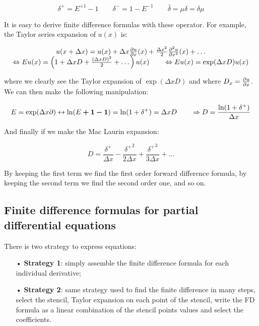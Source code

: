 \begin{equation}
\delta^+ = E^{+1}-1 \qquad \delta^- = 1-E^{-1} \qquad \bar{\delta} = \mu \delta = \delta \mu 
\end{equation}

It is easy to derive finite difference formulas with these operator. For example, the Taylor series expansion of $u(x)$ is: 

\begin{equation}
\begin{array}{c}
u(x+\Delta x) = u(x) + \Delta x\frac{\partial u}{\partial x} (x) + \frac{\Delta x^2}{2} \frac{\partial^2u}{\partial x^2}(x) + \dots \\
 \Leftrightarrow E u(x) = \left( 1 + \Delta x D + \frac{(\Delta x D)^2}{2} + \dots \right) u(x) \qquad \Leftrightarrow Eu(x) = \exp (\Delta x D) u(x)
 \end{array}
\end{equation}

where we clearly see the Taylor expansion of $\exp (\Delta x D)$ and where $D_x = \frac{\partial u }{\partial x}$. We can then make the following manipulation: 

\begin{equation}
E = \exp (\Delta x \partial) \leftrightarrow \ln (E \bm{+1 - 1}) = \ln(1 + \delta ^+) = \Delta x D \qquad \Rightarrow D = \frac{\ln (1 + \delta ^+)}{\Delta x}
\end{equation}

And finally if we make the Mac Laurin expansion: 

\begin{equation}
D = \frac{\delta ^+}{\Delta x} - \frac{{\delta ^+}^2}{2\Delta x} + \frac{{\delta ^+}^3}{3\Delta x} + \dots
\end{equation}

By keeping the first term we find the first order forward difference formula, by keeping the second term we find the second order one, and so on. 

\subsection{Finite difference formulas for partial differential equations}

There is two strategy to express equations: 
\begin{itemize}
\item[•] \textbf{Strategy 1}: simply assemble the finite difference formula for each individual derivative;
\item[•] \textbf{Strategy 2}: same strategy used to find the finite difference in many steps, select the stencil, Taylor expansion on each point of the stencil, write the FD formula as a linear combination of the stencil points values and select the coefficients. 
\end{itemize}

